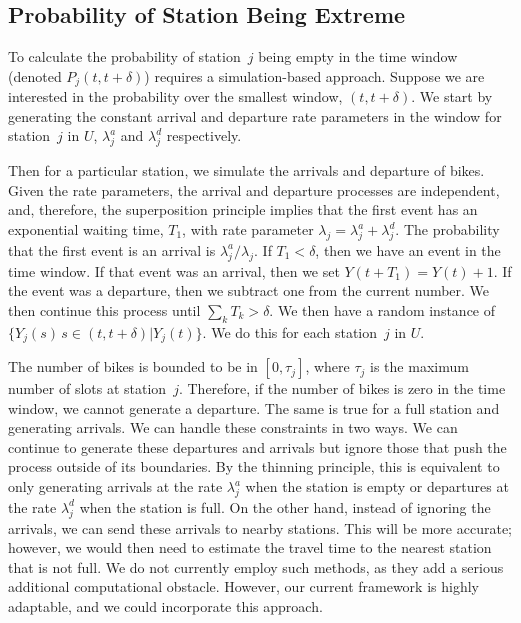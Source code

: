 \documentclass{acm_proc_article-sp}
\begin{document}
\subsection{Probability of Station Being Extreme}

To calculate the probability of station~$j$ being empty in the time window (denoted $P_j (t, t+\delta)$) requires a simulation-based approach.  Suppose we are interested in the probability over the smallest window, $(t, t+\delta)$.  We start by generating the constant arrival and departure rate parameters in the window for station~$j$ in $U$, $\lambda^{a}_j$ and $\lambda^{d}_j$ respectively. 

Then for a particular station, we simulate the arrivals and departure of bikes.  Given the rate parameters, the arrival and departure processes are independent, and, therefore, the superposition principle implies that the first event has an exponential waiting time, $T_1$, with rate parameter $\lambda_j = \lambda^{a}_j + \lambda^{d}_j$.  The probability that the first event is an arrival is $\lambda^{a}_j / \lambda_j$.   If $T_1 < \delta$, then we have an event in the time window.  If that event was an arrival, then we set $Y(t+T_1) = Y(t) + 1$.  If the event was a departure, then we subtract one from the current number.  We then continue this process until $\sum_{k} T_k > \delta$.  We then have a random instance of $\{ Y_j(s) \, s \in (t, t+\delta) | Y_j(t) \}$.  We do this for each station~$j$ in $U$.

The number of bikes is bounded to be in $[0, \tau_j]$, where $\tau_j$ is the maximum number of slots at station~$j$.  Therefore, if the number of bikes is zero in the time window, we cannot generate a departure.  The same is true for a full station and generating arrivals.  We can handle these constraints in two ways.  We can continue to generate these departures and arrivals but ignore those that push the process outside of its boundaries.  By the thinning principle, this is equivalent to only generating arrivals at the rate $\lambda^{a}_j$ when the station is empty or departures at the rate $\lambda^{d}_j$ when the station is full.   On the other hand, instead of ignoring the arrivals, we can send these arrivals to nearby stations.  This will be more accurate; however, we would then need to estimate the travel time to the nearest station that is not full.  We do not currently employ such methods, as they add a serious additional computational obstacle.  However, our current framework is highly adaptable, and we could incorporate this approach.
\end{document}
